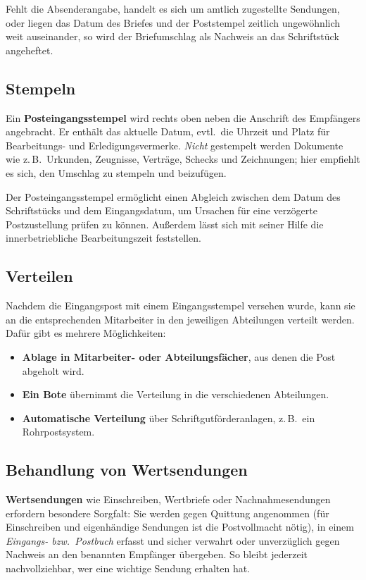 \documentclass[11pt, a4paper]{article}
\begin{document}
Fehlt die Absenderangabe, handelt es sich um amtlich zugestellte Sendungen, oder liegen das
Datum des Briefes und der Poststempel zeitlich ungewöhnlich weit auseinander, so wird der
Briefumschlag als Nachweis an das Schriftstück angeheftet.

\subsection{Stempeln}

Ein \textbf{Posteingangsstempel} wird rechts oben neben die Anschrift des Empfängers angebracht.
Er enthält das aktuelle Datum, evtl.\ die Uhrzeit und Platz für Bearbeitungs- und
Erledigungsvermerke. \emph{Nicht} gestempelt werden Dokumente wie z.\,B.\ Urkunden, Zeugnisse,
Verträge, Schecks und Zeichnungen; hier empfiehlt es sich, den Umschlag zu stempeln und
beizufügen.

Der Posteingangsstempel ermöglicht einen Abgleich zwischen dem Datum des Schriftstücks und dem
Eingangsdatum, um Ursachen für eine verzögerte Postzustellung prüfen zu können. Außerdem lässt
sich mit seiner Hilfe die innerbetriebliche Bearbeitungszeit feststellen.

\subsection{Verteilen}

Nachdem die Eingangspost mit einem Eingangsstempel versehen wurde, kann sie an die
entsprechenden Mitarbeiter in den jeweiligen Abteilungen verteilt werden. Dafür gibt es
mehrere Möglichkeiten:

\begin{itemize}
  \item \textbf{Ablage in Mitarbeiter- oder Abteilungsfächer}, aus denen die Post abgeholt wird.
  \item \textbf{Ein Bote} übernimmt die Verteilung in die verschiedenen Abteilungen.
  \item \textbf{Automatische Verteilung} über Schriftgutförderanlagen, z.\,B.\ ein Rohrpostsystem.
\end{itemize}

\subsection{Behandlung von Wertsendungen}

\textbf{Wertsendungen} wie Einschreiben, Wertbriefe oder Nachnahmesendungen erfordern besondere
Sorgfalt: Sie werden gegen Quittung angenommen (für Einschreiben und eigenhändige Sendungen ist
die Postvollmacht nötig), in einem \emph{Eingangs- bzw.\ Postbuch} erfasst und sicher verwahrt
oder unverzüglich gegen Nachweis an den benannten Empfänger übergeben. So bleibt jederzeit
nachvollziehbar, wer eine wichtige Sendung erhalten hat.
\end{document}
